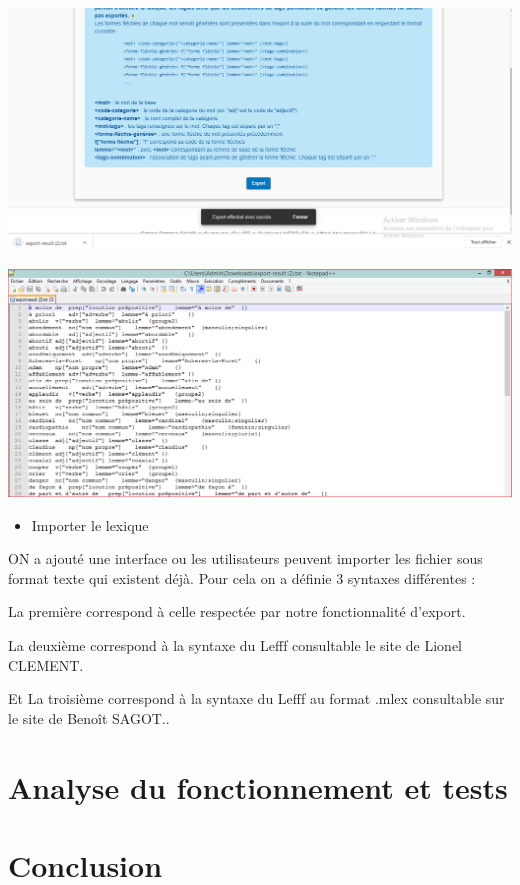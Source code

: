 \documentclass[12pt,a4paper]{article}
\begin{document}
 \includegraphics[width=150mm]{img/ExportReussi.PNG}


 \includegraphics[width=150mm]{img/ExportTxt.PNG}

\begin{itemize}  
  \item Importer le lexique
\end{itemize}
ON a ajouté une interface ou les utilisateurs peuvent importer les fichier sous format texte qui existent déjà. Pour cela on a définie 3 syntaxes différentes : 


La  première correspond à celle respectée par notre fonctionnalité d'export.




La deuxième  correspond à la syntaxe du Lefff consultable le site de Lionel CLEMENT.



Et La troisième  correspond à la syntaxe du Lefff au format .mlex consultable sur le site de Benoît SAGOT..

						


\section{Analyse du fonctionnement et tests}

\section{Conclusion}
\end{document}
